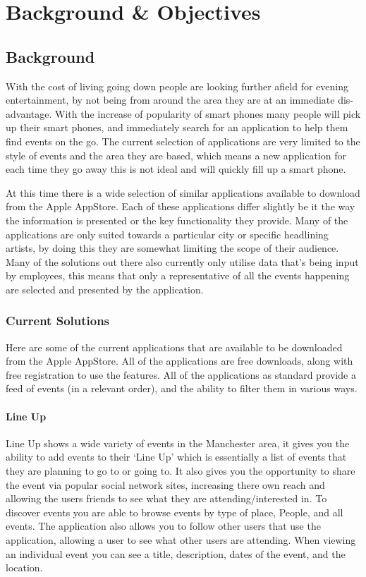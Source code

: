 \chapter{Background \& Objectives}

\section{Background}

	With the cost of living going down people are looking further afield for evening entertainment, by not being from around the area they are at an immediate dis-advantage. With the increase of popularity of smart phones many people will pick up their smart phones, and immediately search for an application to help them find events on the go. The current selection of applications are very limited to the style of events and the area they are based, which means a new application for each time they go away this is not ideal and will quickly fill up a smart phone. 

	At this time there is a wide selection of similar applications available to download from the Apple AppStore. Each of these applications differ slightly be it the way the information is presented or the key functionality they provide. Many of the applications are only suited towards a particular city or specific headlining artists, by doing this they are somewhat limiting the scope of their audience. Many of the solutions out there also currently only utilise data that's being input by employees, this means that only a representative of all the events happening are selected and presented by the application. 

	\subsection{Current Solutions}
		Here are some of the current applications that are available to be downloaded from the Apple AppStore. All of the applications are free downloads, along with free registration to use the features. All of the applications as standard provide a feed of events (in a relevant order), and the ability to filter them in various ways. 

		\subsubsection{Line Up}
			Line Up shows a wide variety of events in the Manchester area, it gives you the ability to add events to their `Line Up' which is essentially a list of events that they are planning to go to or going to. It also gives you the opportunity to share the event via popular social network sites, increasing there own reach and allowing the users friends to see what they are attending/interested in. To discover events you are able to browse events by type of place, People, and all events. The application also allows you to follow other users that use the application, allowing a user to see what other users are attending. When viewing an individual event you can see a title, description, dates of the event, and the location. 

